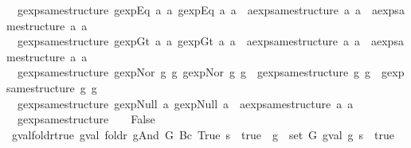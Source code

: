 \begin{isabellebody}
\ \ {\isachardoublequoteopen}gexp{\isacharunderscore}same{\isacharunderscore}structure\ {\isacharparenleft}gexp{\isachardot}Eq\ a{}\ a{}{\isacharparenright}\ {\isacharparenleft}gexp{\isachardot}Eq\ a{}{\isacharprime}\ a{}{\isacharprime}{\isacharparenright}\ {\isacharequal}\ {\isacharparenleft}aexp{\isacharunderscore}same{\isacharunderscore}structure\ a{}\ a{}{\isacharprime}\ {\isasymand}\ aexp{\isacharunderscore}same{\isacharunderscore}structure\ a{}\ a{}{\isacharprime}{\isacharparenright}{\isachardoublequoteclose}\ {\isacharbar}\isanewline
\ \ {\isachardoublequoteopen}gexp{\isacharunderscore}same{\isacharunderscore}structure\ {\isacharparenleft}gexp{\isachardot}Gt\ a{}\ a{}{\isacharparenright}\ {\isacharparenleft}gexp{\isachardot}Gt\ a{}{\isacharprime}\ a{}{\isacharprime}{\isacharparenright}\ {\isacharequal}\ {\isacharparenleft}aexp{\isacharunderscore}same{\isacharunderscore}structure\ a{}\ a{}{\isacharprime}\ {\isasymand}\ aexp{\isacharunderscore}same{\isacharunderscore}structure\ a{}\ a{}{\isacharprime}{\isacharparenright}{\isachardoublequoteclose}\ {\isacharbar}\isanewline
\ \ {\isachardoublequoteopen}gexp{\isacharunderscore}same{\isacharunderscore}structure\ {\isacharparenleft}gexp{\isachardot}Nor\ g{}\ g{}{\isacharparenright}\ {\isacharparenleft}gexp{\isachardot}Nor\ g{}{\isacharprime}\ g{}{\isacharprime}{\isacharparenright}\ {\isacharequal}\ {\isacharparenleft}gexp{\isacharunderscore}same{\isacharunderscore}structure\ g{}\ g{}{\isacharprime}\ {\isasymand}\ gexp{\isacharunderscore}same{\isacharunderscore}structure\ g{}\ g{}{\isacharprime}{\isacharparenright}{\isachardoublequoteclose}\ {\isacharbar}\isanewline
\ \ {\isachardoublequoteopen}gexp{\isacharunderscore}same{\isacharunderscore}structure\ {\isacharparenleft}gexp{\isachardot}Null\ a{}{\isacharparenright}\ {\isacharparenleft}gexp{\isachardot}Null\ a{}{\isacharparenright}\ {\isacharequal}\ aexp{\isacharunderscore}same{\isacharunderscore}structure\ a{}\ a{}{\isachardoublequoteclose}\ {\isacharbar}\isanewline
\ \ {\isachardoublequoteopen}gexp{\isacharunderscore}same{\isacharunderscore}structure\ {\isacharunderscore}\ {\isacharunderscore}\ {\isacharequal}\ False{\isachardoublequoteclose}\isanewline
\isanewline
{}\isamarkupfalse%
\ gval{\isacharunderscore}foldr{\isacharunderscore}true{\isacharcolon}\ {\isachardoublequoteopen}{\isacharparenleft}gval\ {\isacharparenleft}foldr\ gAnd\ G\ {\isacharparenleft}Bc\ True{\isacharparenright}{\isacharparenright}\ s\ {\isacharequal}\ true{\isacharparenright}\ {\isacharequal}\ {\isacharparenleft}{\isasymforall}g\ {\isasymin}\ set\ G{\isachardot}\ gval\ g\ s\ {\isacharequal}\ true{\isacharparenright}{\isachardoublequoteclose}\isanewline

\end{isabellebody}
